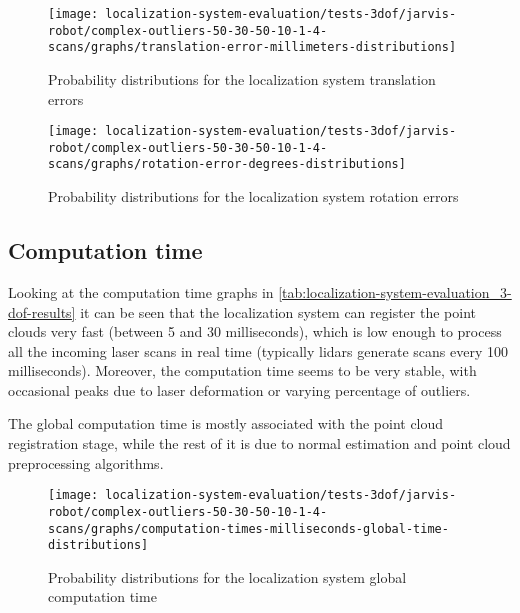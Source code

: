 \begin{figure}[H]
	\centering
	\begin{minipage}[H]{0.47\textwidth}
		\centering
		\texttt{[image: localization-system-evaluation/tests-3dof/jarvis-robot/complex-outliers-50-30-50-10-1-4-scans/graphs/translation-error-millimeters-distributions]}
		\caption{Probability distributions for the localization system translation errors}
		\label{fig:localization-system-evaluation_complex-path-with-outliers-50-30-50-10cm-per-sec-velocity-1-4-translation-error}
	\end{minipage}\hfill
	\begin{minipage}[H]{0.47\textwidth}
		\centering
		\texttt{[image: localization-system-evaluation/tests-3dof/jarvis-robot/complex-outliers-50-30-50-10-1-4-scans/graphs/rotation-error-degrees-distributions]}
		\caption{Probability distributions for the localization system rotation errors}
		\label{fig:localization-system-evaluation_complex-path-with-outliers-50-30-50-10cm-per-sec-velocity-1-4-rotation-error}
	\end{minipage}
\end{figure}



\subsection{Computation time}

Looking at the computation time graphs in \cref{tab:localization-system-evaluation_3-dof-results} it can be seen that the localization system can register the point clouds very fast (between 5 and 30 milliseconds), which is low enough to process all the incoming laser scans in real time (typically \glspl{lidar} generate scans every 100 milliseconds). Moreover, the computation time seems to be very stable, with occasional peaks due to laser deformation or varying percentage of outliers.

The global computation time is mostly associated with the point cloud registration stage, while the rest of it is due to normal estimation and point cloud preprocessing algorithms.

\begin{figure}[H]
	\centering
	\texttt{[image: localization-system-evaluation/tests-3dof/jarvis-robot/complex-outliers-50-30-50-10-1-4-scans/graphs/computation-times-milliseconds-global-time-distributions]}
	\caption{Probability distributions for the localization system global computation time}
	\label{fig:localization-system-evaluation_complex-path-with-outliers-50-30-50-10cm-per-sec-velocity-1-4-scans-computation-time}
\end{figure}



